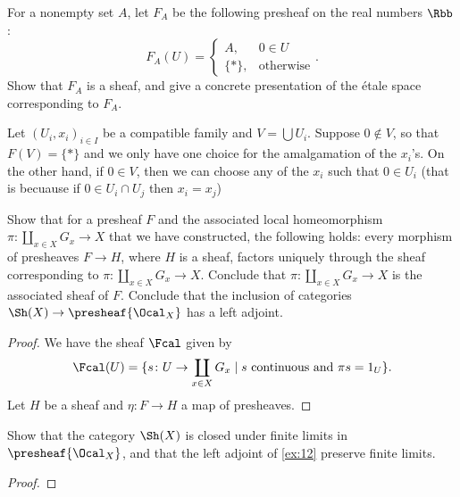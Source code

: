 \begin{exercise}{11}
    For a nonempty set $A$, let $F_A$ be the following presheaf on the real numbers $\Rbb$:
    \[ F_A(U)=\begin{cases}
        A,&0\in U\\
        \{*\},&\text{otherwise}
    \end{cases}. \]
    Show that $F_A$ is a sheaf, and give a concrete presentation of the \'etale space corresponding to $F_A$. 
\begin{solution}
    Let $(U_i, x_i)_{i\in I}$ be a compatible family and $V=\bigcup U_i$. Suppose $0\not\in V$, so that $F(V)=\{*\}$ and we only have one choice for the amalgamation of the $x_i$'s. On the other hand, if $0\in V$, then we can choose any of the $x_i$ such that $0\in U_i$ (that is becuause if $0\in U_i\cap U_j$ then $x_i=x_j$)
\end{solution}
\end{exercise}

\begin{exercise}{12}
    Show that for a presheaf $F$ and the associated local homeomorphism $\pi\colon\coprod_{x\in X} G_x\to X$ that we have constructed, the following holds: every morphism of presheaves $F\to H$, where $H$ is a sheaf, factors uniquely through the sheaf corresponding to $\pi\colon\coprod_{x\in X} G_x\to X$. Conclude that $\pi\colon\coprod_{x\in X}G_x\to X$ is the associated sheaf of $F$. Conclude that the inclusion of categories $\Sh(X)\to\presheaf{\Ocal_X}$ has a left adjoint. 
\begin{solution}
    \begin{proof}
        We have the sheaf $\Fcal$ given by
        \[ \Fcal(U)=\{s\colon U\to \coprod_{x\in X}G_x\mid s\text{ continuous and }\pi s=1_U\}.\]
        Let $H$ be a sheaf and $\eta\colon F\to H$ a map of presheaves.
    \end{proof}
\end{solution}
\end{exercise}

\begin{exercise}{13}
    Show that the category $\Sh(X)$ is closed under finite limits in $\presheaf{\Ocal_X}$, and that the left adjoint of \ref{ex:12} preserve finite limits.
\begin{solution}
    \begin{proof}
    \end{proof}
\end{solution}
\end{exercise}


